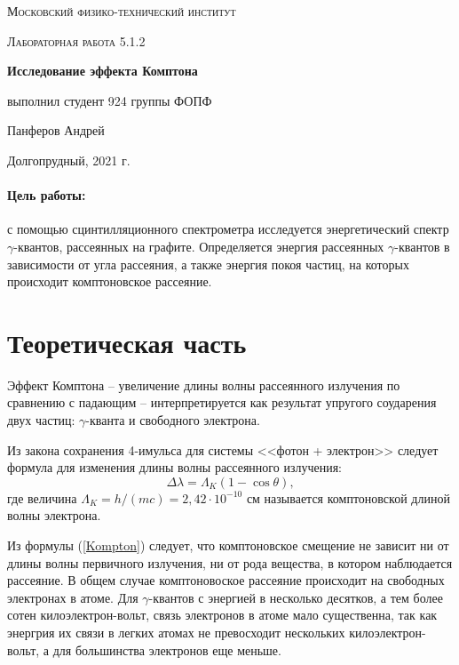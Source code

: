 \documentclass[a4paper, 12pt]{article}
\begin{document}
	
\begin{titlepage}
	\centering
	\vspace{5cm}
	{\scshape\LARGE Московский физико-технический институт \par}
	\vspace{4cm}
	{\scshape\Large Лабораторная работа 5.1.2 \par}
	\vspace{1cm}
	{\huge\bfseries Исследование эффекта Комптона \par}
	\vspace{1cm}
	\vfill
\begin{flushright}
	{\large выполнил студент 924 группы ФОПФ}\par
	\vspace{0.3cm}
	{\LARGE Панферов Андрей}
\end{flushright}
	

	\vfill

	Долгопрудный, 2021 г.
\end{titlepage}

\paragraph*{Цель работы:} с помощью сцинтилляционного спектрометра исследуется энергетический спектр $\gamma$-квантов, рассеянных на графите. Определяется энергия рассеянных $\gamma$-квантов в зависимости от угла рассеяния, а также энергия покоя частиц, на которых происходит комптоновское рассеяние.


\section*{Теоретическая часть}
	Эффект Комптона -- увеличение длины волны рассеянного излучения по сравнению с падающим -- интерпретируется как результат упругого соударения двух частиц: $\gamma$-кванта и свободного электрона.
	
	Из закона сохранения 4-имульса для системы <<фотон + электрон>> следует формула для изменения длины волны рассеянного излучения:
	\begin{equation}
		\label{Kompton}
		\tag{$\star$}
		\Delta \lambda = \Lambda_K(1-\cos\theta),
	\end{equation}
	где величина $\Lambda_K = h/(mc) = 2,42 \cdot 10^{-10}$ см называется комптоновской длиной волны электрона.
	
	Из формулы (\ref{Kompton}) следует, что комптоновское смещение не зависит ни от длины волны первичного излучения, ни от рода вещества, в котором наблюдается рассеяние. В общем случае комптоновоское рассеяние происходит на свободных электронах в атоме. Для $\gamma$-квантов с энергией в несколько десятков, а тем более сотен килоэлектрон-вольт, связь электронов в атоме мало существенна, так как энергрия их связи в легких атомах не превосходит нескольких килоэлектрон-вольт, а для большинства электронов еще меньше.
	
\end{document}

